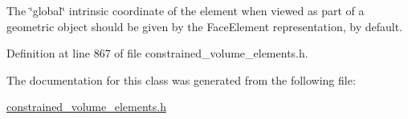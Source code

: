 The \char`\"{}global\char`\"{} intrinsic coordinate of the element when viewed as part of a geometric object should be given by the Face\+Element representation, by default. 



Definition at line 867 of file constrained\+\_\+volume\+\_\+elements.\+h.



The documentation for this class was generated from the following file\+:\begin{DoxyCompactItemize}
\item 
\hyperlink{constrained__volume__elements_8h}{constrained\+\_\+volume\+\_\+elements.\+h}\end{DoxyCompactItemize}
